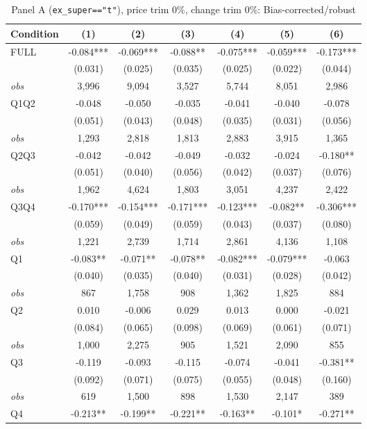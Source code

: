 \documentclass[11pt]{article}
\begin{document}
\begin{table}[!htbp]
\centering
\caption{Panel A (\texttt{ex\_super=="t"}), price trim 0\%, change trim 0\%: Bias-corrected/robust}
\label{tab:a:trim00:robust}
\small
\begin{tabular}{lcccccc}
\toprule
Condition & (1) & (2) & (3) & (4) & (5) & (6) \\
\midrule
FULL & -0.084*** & -0.069*** & -0.088** & -0.075*** & -0.059*** & -0.173*** \\
 & (0.031) & (0.025) & (0.035) & (0.025) & (0.022) & (0.044) \\
\textit{obs} & 3,996 & 9,094 & 3,527 & 5,744 & 8,051 & 2,986 \\
Q1Q2 & -0.048 & -0.050 & -0.035 & -0.041 & -0.040 & -0.078 \\
 & (0.051) & (0.043) & (0.048) & (0.035) & (0.031) & (0.056) \\
\textit{obs} & 1,293 & 2,818 & 1,813 & 2,883 & 3,915 & 1,365 \\
Q2Q3 & -0.042 & -0.042 & -0.049 & -0.032 & -0.024 & -0.180** \\
 & (0.051) & (0.040) & (0.056) & (0.042) & (0.037) & (0.076) \\
\textit{obs} & 1,962 & 4,624 & 1,803 & 3,051 & 4,237 & 2,422 \\
Q3Q4 & -0.170*** & -0.154*** & -0.171*** & -0.123*** & -0.082** & -0.306*** \\
 & (0.059) & (0.049) & (0.059) & (0.043) & (0.037) & (0.080) \\
\textit{obs} & 1,221 & 2,739 & 1,714 & 2,861 & 4,136 & 1,108 \\
Q1 & -0.083** & -0.071** & -0.078** & -0.082*** & -0.079*** & -0.063 \\
 & (0.040) & (0.035) & (0.040) & (0.031) & (0.028) & (0.042) \\
\textit{obs} &   867 & 1,758 &   908 & 1,362 & 1,825 &   884 \\
Q2 & 0.010 & -0.006 & 0.029 & 0.013 & 0.000 & -0.021 \\
 & (0.084) & (0.065) & (0.098) & (0.069) & (0.061) & (0.071) \\
\textit{obs} & 1,000 & 2,275 &   905 & 1,521 & 2,090 &   855 \\
Q3 & -0.119 & -0.093 & -0.115 & -0.074 & -0.041 & -0.381** \\
 & (0.092) & (0.071) & (0.075) & (0.055) & (0.048) & (0.160) \\
\textit{obs} &   619 & 1,500 &   898 & 1,530 & 2,147 &   389 \\
Q4 & -0.213** & -0.199** & -0.221** & -0.163** & -0.101* & -0.271** \\

\end{tabular}
\end{table}
\end{document}
